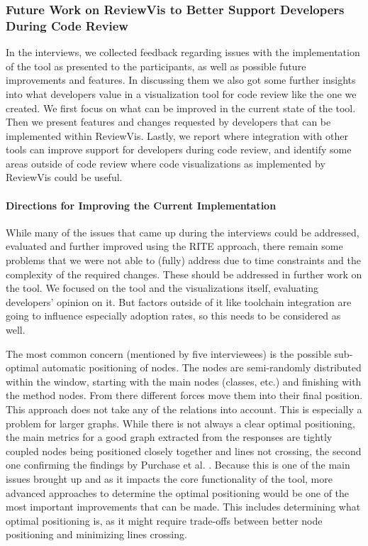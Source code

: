 \documentclass[a4paper,11pt,twoside]{article}
\theoremstyle{definition} %
\renewcommand{\cite}[1]{\citep{#1}}
\begin{document}
\subsubsection{Future Work on ReviewVis to Better Support Developers During Code Review} \label{SubSubSec:RQ2}

In the interviews, we collected feedback regarding issues with the implementation of the tool as presented to the participants, as well as possible future improvements and features. In discussing them we also got some further insights into what developers value in a visualization tool for code review like the one we created. We first focus on what can be improved in the current state of the tool. Then we present features and changes requested by developers that can be implemented within ReviewVis. Lastly, we report where integration with other tools can improve support for developers during code review, and identify some areas outside of code review where code visualizations as implemented by ReviewVis could be useful. 

\paragraph{Directions for Improving the Current Implementation} \label{Par:CurrentImplementationIssues}

While many of the issues that came up during the interviews could be addressed, evaluated and further improved using the RITE approach, there remain some problems that we were not able to (fully) address due to time constraints and the complexity of the required changes. These should be addressed in further work on the tool. We focused on the tool and the visualizations itself, evaluating developers' opinion on it. But factors outside of it like toolchain integration are going to influence especially adoption rates, so this needs to be considered as well. 

The most common concern (mentioned by five interviewees) is the possible sub-optimal automatic positioning of nodes. The nodes are semi-randomly distributed within the window, starting with the main nodes (classes, etc.) and finishing with the method nodes. From there different forces move them into their final position. This approach does not take any of the relations into account. This is especially a problem for larger graphs. While there is not always a clear optimal positioning, the main metrics for a good graph extracted from the responses are tightly coupled nodes being positioned closely together and lines not crossing, the second one confirming the findings by Purchase et al. \cite{10.1007/BFb0021827}. Because this is one of the main issues brought up and as it impacts the core functionality of the tool, more advanced approaches to determine the optimal positioning would be one of the most important improvements that can be made. This includes determining what optimal positioning is, as it might require trade-offs between better node positioning and minimizing lines crossing.
\end{document}
